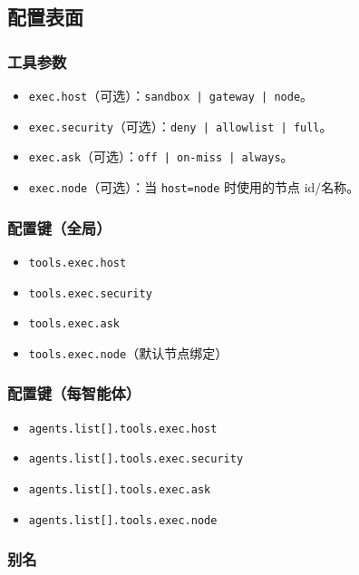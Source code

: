 \subsection{配置表面}


\subsubsection{工具参数}


\begin{itemize}
  \item \texttt{exec.host}（可选）：\texttt{sandbox | gateway | node}。
  \item \texttt{exec.security}（可选）：\texttt{deny | allowlist | full}。
  \item \texttt{exec.ask}（可选）：\texttt{off | on-miss | always}。
  \item \texttt{exec.node}（可选）：当 \texttt{host=node} 时使用的节点 id/名称。
\end{itemize}


\subsubsection{配置键（全局）}


\begin{itemize}
  \item \texttt{tools.exec.host}
  \item \texttt{tools.exec.security}
  \item \texttt{tools.exec.ask}
  \item \texttt{tools.exec.node}（默认节点绑定）
\end{itemize}


\subsubsection{配置键（每智能体）}


\begin{itemize}
  \item \texttt{agents.list[].tools.exec.host}
  \item \texttt{agents.list[].tools.exec.security}
  \item \texttt{agents.list[].tools.exec.ask}
  \item \texttt{agents.list[].tools.exec.node}
\end{itemize}


\subsubsection{别名}



